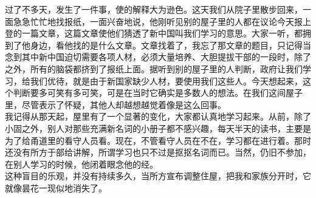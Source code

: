 过了不多天，发生了一件事，使的解释大为逊色。这天我们从院子里散步回来，一面急急忙忙地找报纸，一面兴奋地说，他刚听见别的屋子里的人都在议论今天报上登的一篇文章，这篇文章使他们猜透了新中国叫我们学习的意思。大家一听，都拥到了他身边，看他找的是什么文章。文章找着了，我忘了那文章的题目，只记得当念到其中新中国迫切需要各项人材，必须大量培养、大胆提拔干部的一段时，除了之外，所有的脑袋都挤到了报纸上面。据听到别的屋子里的人判断，政府让我们学习，给我们优待，就是由于新国家缺少人材，要使用我们这些人。今天想起来，这个判断要多可笑有多可笑，可是在当时它确实是多数人的想法。在我们这间屋子里，尽管表示了怀疑，其他人却越想越觉着像是这么回事。\\

我记得从那天起，屋里有了一个显著的变化，大家都认真地学习起来。从前，除了小固之外，别人对那些充满新名词的小册子都不感兴趣，每天半天的读书，主要是为了给甬道里的看守人员看。现在，不管看守人员在不在，学习都在进行着。那时还没有所方于部给讲解，所谓学习也只不过是抠抠名词而已。当然，仍旧不参加，在别人学习的时候，他闭着眼念他的经。\\

这种盲目的乐观，并没有持续多久，当所方宣布调整住屋，把我和家族分开时，它就像昙花一现似地消失了。
